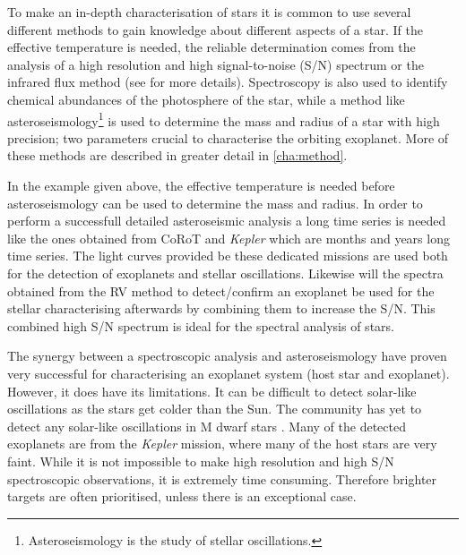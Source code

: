 To make an in-depth characterisation of stars it is common to use several different methods to gain
knowledge about different aspects of a star. If the effective temperature is needed, the reliable
determination comes from the analysis of a high resolution and high signal-to-noise (S/N) spectrum
or the infrared flux method (see  for more details). Spectroscopy is also used to
identify chemical abundances of the photosphere of the star, while a method like
asteroseismology\footnote{Asteroseismology is the study of stellar oscillations.} is used to
determine the mass and radius of a star with high precision; two parameters crucial to characterise
the orbiting exoplanet. More of these methods are described in greater detail in \cref{cha:method}.

In the example given above, the effective temperature is needed before asteroseismology can be used
to determine the mass and radius. In order to perform a successfull detailed asteroseismic analysis
a long time series is needed like the ones obtained from CoRoT and \emph{Kepler} which are months
and years long time series. The light curves provided be these dedicated missions are used both for
the detection of exoplanets and stellar oscillations. Likewise will the spectra obtained from the RV
method to detect/confirm an exoplanet be used for the stellar characterising afterwards by combining
them to increase the S/N. This combined high S/N spectrum is ideal for the spectral analysis of
stars.

The synergy between a spectroscopic analysis and asteroseismology have proven very successful
\citep[see e.g.][]{Huber2013} for characterising an exoplanet system (host star and exoplanet).
However, it does have its limitations. It can be difficult to detect solar-like oscillations as the
stars get colder than the Sun. The community has yet to detect any solar-like oscillations in M
dwarf stars \citep{Rodriguez2016,Berdinas2017}. Many of the detected exoplanets are from the
\emph{Kepler} mission, where many of the host stars are very faint. While it is not impossible to
make high resolution and high S/N spectroscopic observations, it is extremely time consuming.
Therefore brighter targets are often prioritised, unless there is an exceptional case.

